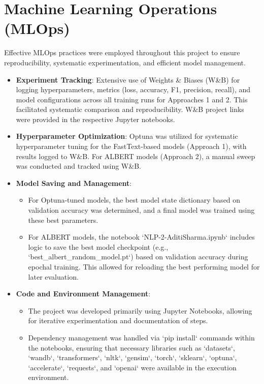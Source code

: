 \documentclass[10.5pt]{article}
\begin{document}
\section{Machine Learning Operations (MLOps)}
Effective MLOps practices were employed throughout this project to ensure reproducibility, systematic experimentation, and efficient model management.
\begin{itemize}
    \item \textbf{Experiment Tracking}: Extensive use of Weights \& Biases (W\&B) for logging hyperparameters, metrics (loss, accuracy, F1, precision, recall), and model configurations across all training runs for Approaches 1 and 2. This facilitated systematic comparison and reproducibility. W\&B project links were provided in the respective Jupyter notebooks.
    \item \textbf{Hyperparameter Optimization}: Optuna was utilized for systematic hyperparameter tuning for the FastText-based models (Approach 1), with results logged to W\&B. For ALBERT models (Approach 2), a manual sweep was conducted and tracked using W\&B.
    \item \textbf{Model Saving and Management}:
        \begin{itemize}
            \item For Optuna-tuned models, the best model state dictionary based on validation accuracy was determined, and a final model was trained using these best parameters.
            \item For ALBERT models, the notebook `NLP-2-AditiSharma.ipynb` includes logic to save the best model checkpoint (e.g., `best\_albert\_random\_model.pt`) based on validation accuracy during epochal training. This allowed for reloading the best performing model for later evaluation.
        \end{itemize}
    \item \textbf{Code and Environment Management}:
        \begin{itemize}
            \item The project was developed primarily using Jupyter Notebooks, allowing for iterative experimentation and documentation of steps.
            \item Dependency management was handled via `pip install` commands within the notebooks, ensuring that necessary libraries such as `datasets`, `wandb`, `transformers`, `nltk`, `gensim`, `torch`, `sklearn`, `optuna`, `accelerate`, `requests`, and `openai` were available in the execution environment.
        \end{itemize}

\end{itemize}
\end{document}

